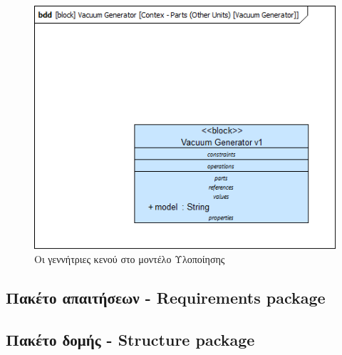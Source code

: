 \documentclass[a4paper,12pt,twoside]{report}
\begin{document}
\begin{appendices}
				\begin{figure}[hp]
					\centering
					\includegraphics[scale=0.50]{DesignModel_Contex-Parts(OtherUnits)[VacuumGenerator].png}
					\caption{Οι γεννήτριες κενού στο μοντέλο Υλοποίησης}
					\label{φωτ:Οι γεννήτριες κενού στο μοντέλο Υλοποίησης}
				\end{figure}
				
			\FloatBarrier
			\subsection{Πακέτο απαιτήσεων - Requirements package}
			
			\FloatBarrier
			\subsection{Πακέτο δομής - Structure package}
			

\end{appendices}
\end{document}
